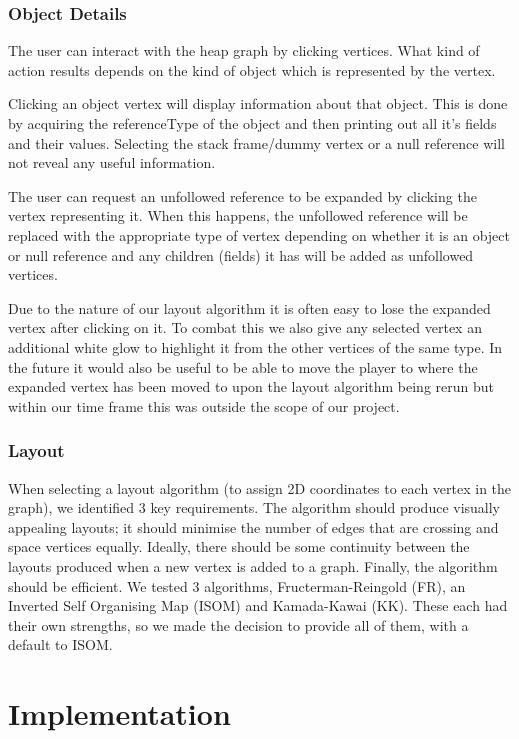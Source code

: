 \documentclass[11pt, a4paper]{report}
\begin{document}
\subsection{Object Details}

The user can interact with the heap graph by clicking vertices. What kind of action results depends on the kind of object which is represented by the vertex.

Clicking an object vertex will display information about that object. This is done by acquiring the referenceType of the object and then printing out all it’s fields and their values. Selecting the stack frame/dummy vertex or a null reference will not reveal any useful information.

The user can request an unfollowed reference to be expanded by clicking the vertex representing it. When this happens, the unfollowed reference will be replaced with the appropriate type of vertex depending on whether it is an object or null reference and any children (fields) it has will be added as unfollowed vertices.

Due to the nature of our layout algorithm it is often easy to lose the expanded vertex after clicking on it. To combat this we also give any selected vertex an additional white glow to highlight it from the other vertices of the same type. In the future it would also be useful to be able to move the player to where the expanded vertex has been moved to upon the layout algorithm being rerun but within our time frame this was outside the scope of our project.

\subsection{Layout}

When selecting a layout algorithm (to assign 2D coordinates to each vertex in the graph), we identified 3 key requirements. The algorithm should produce visually appealing layouts; it should minimise the number of edges that are crossing and space vertices equally. Ideally, there should be some continuity between the layouts produced when a new vertex is added to a graph. Finally, the algorithm should be efficient. We tested 3 algorithms, Fructerman-Reingold (FR), an Inverted Self Organising Map (ISOM) and Kamada-Kawai (KK). These each had their own strengths, so we made the decision to provide all of them, with a default to ISOM.

\chapter{Implementation}
\end{document}
